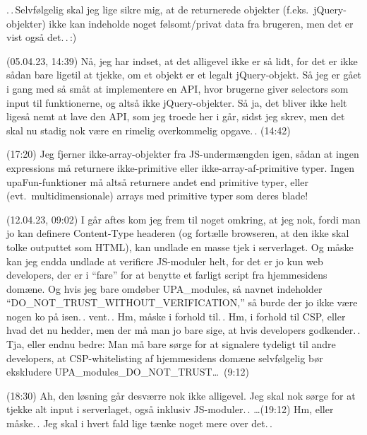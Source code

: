 \documentclass{report}
\begin{document}
.\,.\,Selvfølgelig skal jeg lige sikre mig, at de returnerede objekter (f.eks.\ jQuery-objekter) ikke kan indeholde noget følsomt/privat data fra brugeren, men det er vist også det.\,.\,:) 


(05.04.23, 14:39) Nå, jeg har indset, at det alligevel ikke er så lidt, for det er ikke sådan bare ligetil at tjekke, om et objekt er et legalt jQuery-objekt. Så jeg er gået i gang med så småt at implementere en API, hvor brugerne giver selectors som input til funktionerne, og altså ikke jQuery-objekter. Så ja, det bliver ikke helt ligeså nemt at lave den API, som jeg troede her i går, sidst jeg skrev, men det skal nu stadig nok være en rimelig overkommelig opgave.\,. (14:42)

(17:20) Jeg fjerner ikke-array-objekter fra JS-undermængden igen, sådan at ingen expressions må returnere ikke-primitive eller ikke-array-af-primitive typer. Ingen upaFun-funktioner må altså returnere andet end primitive typer, eller (evt.\ multidimensionale) arrays med primitive typer som deres blade!


(12.04.23, 09:02) %
I går aftes kom jeg frem til noget omkring, at jeg nok, fordi man jo kan definere Content-Type headeren (og fortælle browseren, at den ikke skal tolke outputtet som HTML), kan undlade en masse tjek i serverlaget. Og måske kan jeg endda undlade at verificre JS-moduler helt, for det er jo kun web developers, der er i ``fare'' for at benytte et farligt script fra hjemmesidens domæne. Og hvis jeg bare omdøber UPA\_modules, så navnet indeholder ``DO\_NOT\_TRUST\_WITHOUT\_VERIFICATION,'' så burde der jo ikke være nogen ko på isen.\,. vent.\,. Hm, måske i forhold til.\,. Hm, i forhold til CSP, eller hvad det nu hedder, men der må man jo bare sige, at hvis developers godkender.\,. Tja, eller endnu bedre: Man må bare sørge for at signalere tydeligt til andre developers, at CSP-whitelisting af hjemmesidens domæne selvfølgelig bør ekskludere UPA\_modules\_DO\_NOT\_TRUST\ldots\ (9:12)

(18:30) Ah, den løsning går desværre nok ikke alligevel. Jeg skal nok sørge for at tjekke alt input i serverlaget, også inklusiv JS-moduler.\,. \ldots (19:12) Hm, eller måske.\,. Jeg skal i hvert fald lige tænke noget mere over det.\,. 
\end{document}
